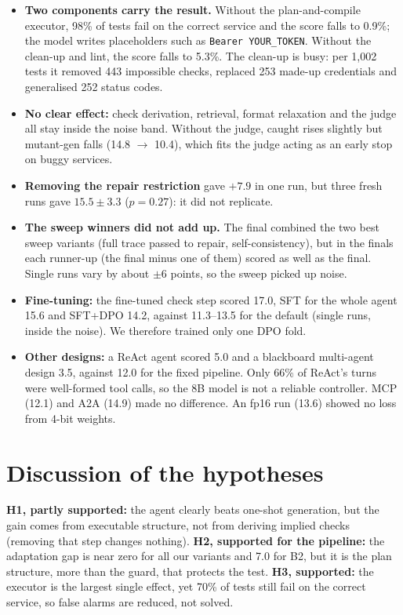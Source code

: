 \documentclass[11pt,a4paper]{article}
\begin{document}
\begin{itemize}
\item \textbf{Two components carry the result.} Without the plan-and-compile executor, 98\% of tests fail on the correct service and the score falls to 0.9\%; the model writes placeholders such as \texttt{Bearer YOUR\_TOKEN}. Without the clean-up and lint, the score falls to 5.3\%. The clean-up is busy: per 1{,}002 tests it removed 443 impossible checks, replaced 253 made-up credentials and generalised 252 status codes.
\item \textbf{No clear effect:} check derivation, retrieval, format relaxation and the judge all stay inside the noise band. Without the judge, caught rises slightly but mutant-gen falls (14.8 $\to$ 10.4), which fits the judge acting as an early stop on buggy services.
\item \textbf{Removing the repair restriction} gave $+7.9$ in one run, but three fresh runs gave $15.5\pm3.3$ ($p=0.27$): it did not replicate.
\item \textbf{The sweep winners did not add up.} The final combined the two best sweep variants (full trace passed to repair, self-consistency), but in the finals each runner-up (the final minus one of them) scored as well as the final. Single runs vary by about $\pm6$ points, so the sweep picked up noise.
\item \textbf{Fine-tuning:} the fine-tuned check step scored 17.0, SFT for the whole agent 15.6 and SFT+DPO 14.2, against 11.3--13.5 for the default (single runs, inside the noise). We therefore trained only one DPO fold.
\item \textbf{Other designs:} a ReAct agent scored 5.0 and a blackboard multi-agent design 3.5, against 12.0 for the fixed pipeline. Only 66\% of ReAct's turns were well-formed tool calls, so the 8B model is not a reliable controller. MCP (12.1) and A2A (14.9) made no difference. An fp16 run (13.6) showed no loss from 4-bit weights.
\end{itemize}

\section{Discussion of the hypotheses}
\textbf{H1, partly supported:} the agent clearly beats one-shot generation, but the gain comes from executable structure, not from deriving implied checks (removing that step changes nothing). \textbf{H2, supported for the pipeline:} the adaptation gap is near zero for all our variants and 7.0 for B2, but it is the plan structure, more than the guard, that protects the test. \textbf{H3, supported:} the executor is the largest single effect, yet 70\% of tests still fail on the correct service, so false alarms are reduced, not solved.
\end{document}
